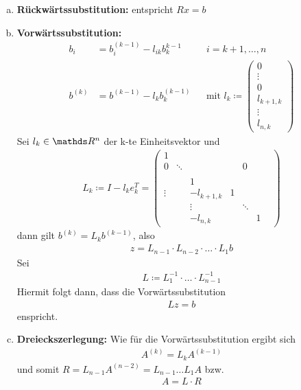  
\begin{enumerate}[a)]
\item \textbf{Rückwärtssubstitution:} entspricht $Rx=b$
\item \textbf{Vorwärtssubstitution:} 
  \begin{align*}
    b_i&=b_i^{(k-1)}-l_{ik}b_k^{k-1} && i=k+1, \dotsc , n\\
    b^{(k)} &= b^{(k-1)}-l_kb_k^{(k-1)} 
                                     && \text{mit }l_k\coloneqq 
                                        \begin{pmatrix}0\\\vdots\\ 0\\ l_{k+1,k}\\\vdots \\l_{n,k}\end{pmatrix}
  \end{align*}
  Sei $l_k\in\R^n$ der k-te Einheitsvektor und 
  \begin{gather}
    L_k \coloneqq I- l_ke_k^T = \begin{pmatrix}
      1&&&&&&\\
      0&\ddots&&&0\\
      \\
      &&1\\
      \vdots&&-l_{k+1,k}&1\\
      &&\vdots&&\ddots \\
      &&-l_{n,k}&&&1
    \end{pmatrix}
    \label{II.1.9}
  \end{gather}
  dann gilt $b^{(k)} =L_kb^{(k-1)}$, also
  \begin{gather*}
    z = L_{n-1}\cdot L_{n-2} \cdot \dots \cdot L_1b
  \end{gather*}
  Sei
  \begin{gather}
    L\coloneqq L_1^{-1} \cdot \dots \cdot L_{n-1}^{-1}
    \label{II.1.10}
  \end{gather}
  Hiermit folgt dann, dass die Vorwärtssubstitution
  \begin{gather}
    Lz=b\label{II.1.11}
  \end{gather}
  enspricht.
\item \textbf{Dreieckszerlegung:} Wie für die Vorwärtssubstitution ergibt sich
  \begin{gather*}
    A^{(k)}=L_kA^{(k-1)}
  \end{gather*}
  und somit $R=L_{n-1}A^{(n-2)}= L_{n-1}\dots L_1A $ bzw.
  \begin{gather} 
    A=L\cdot R
    \label{II.1.12}
  \end{gather}
\end{enumerate}


